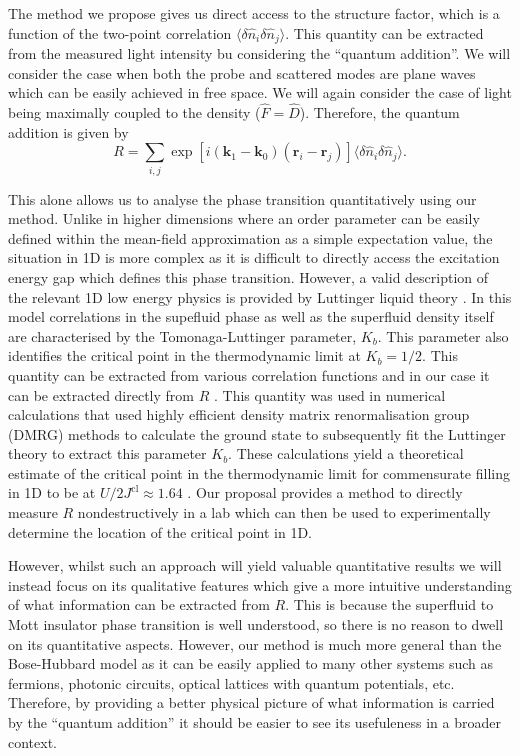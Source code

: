 The method we propose gives us direct access to the structure factor,
which is a function of the two-point correlation $\langle \delta
\hat{n}_i \delta \hat{n}_j \rangle$. This quantity can be extracted
from the measured light intensity bu considering the ``quantum
addition''. We will consider the case when both the probe and
scattered modes are plane waves which can be easily achieved in free
space. We will again consider the case of light being maximally
coupled to the density ($\hat{F} = \hat{D}$). Therefore, the quantum
addition is given by
\begin{equation} 
  R =\sum_{i, j} \exp[i (\mathbf{k}_1 - \mathbf{k}_0)
  (\mathbf{r}_i - \mathbf{r}_j)] \langle \delta \hat{n}_i \delta
  \hat{n}_j \rangle.
\end{equation}


This alone allows us to analyse the phase transition quantitatively
using our method. Unlike in higher dimensions where an order parameter
can be easily defined within the mean-field approximation as a simple
expectation value, the situation in 1D is more complex as it is
difficult to directly access the excitation energy gap which defines
this phase transition. However, a valid description of the relevant 1D
low energy physics is provided by Luttinger liquid theory
\cite{giamarchi}. In this model correlations in the supefluid phase as
well as the superfluid density itself are characterised by the
Tomonaga-Luttinger parameter, $K_b$. This parameter also identifies
the critical point in the thermodynamic limit at $K_b = 1/2$. This
quantity can be extracted from various correlation functions and in
our case it can be extracted directly from $R$ \cite{ejima2011}. This
quantity was used in numerical calculations that used highly efficient
density matrix renormalisation group (DMRG) methods to calculate the
ground state to subsequently fit the Luttinger theory to extract this
parameter $K_b$. These calculations yield a theoretical estimate of
the critical point in the thermodynamic limit for commensurate filling
in 1D to be at $U/2J^\text{cl} \approx 1.64$ \cite{ejima2011}. Our
proposal provides a method to directly measure $R$ nondestructively in
a lab which can then be used to experimentally determine the location
of the critical point in 1D.

However, whilst such an approach will yield valuable quantitative
results we will instead focus on its qualitative features which give a
more intuitive understanding of what information can be extracted from
$R$. This is because the superfluid to Mott insulator phase transition
is well understood, so there is no reason to dwell on its quantitative
aspects. However, our method is much more general than the
Bose-Hubbard model as it can be easily applied to many other systems
such as fermions, photonic circuits, optical lattices with quantum
potentials, etc. Therefore, by providing a better physical picture of
what information is carried by the ``quantum addition'' it should be
easier to see its usefuleness in a broader context.

